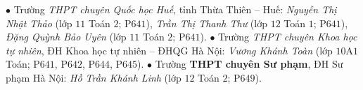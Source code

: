 \begin{multicols}{2}
	\vskip 0.1cm
	$\bullet$ Trường \textit{THPT chuyên Quốc học Huế}, tỉnh Thừa Thiên -- Huế: \textit{Nguyễn Thị Nhật Thảo} (lớp $11$ Toán $2$; P$641$), \textit{Trần Thị Thanh Thư} (lớp $12$ Toán $1$; P$641$), \textit{Đặng Quỳnh Bảo Uyên} (lớp $11$ Toán $2$; P$641$).
	\vskip 0.1cm
	$\bullet$ Trường \textit{THPT chuyên Khoa học tự nhiên}, ĐH Khoa học tự nhiên -- ĐHQG Hà Nội: \textit{Vương Khánh Toàn} (lớp $10$A$1$ Toán; P$641$, P$642$, P$644$, P$645$).
	\vskip 0.1cm
	$\bullet$ Trường \textbf{\color{thachthuctoanhoc}THPT chuyên Sư phạm}, ĐH Sư phạm Hà Nội: \textit{Hồ Trần Khánh Linh} (lớp $12$ Toán $2$; P$649$).
\end{multicols}


